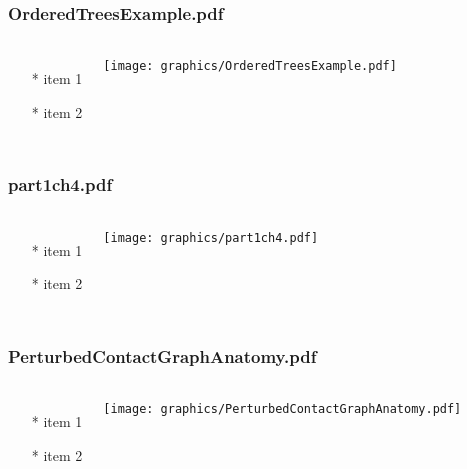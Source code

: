 \begin{frame} \frametitle{OrderedTreesExample.pdf}
    \begin{columns}[c]
        \begin{itemize}
            \item[*] item 1
            \item[*] item 2
        \end{itemize}
        \begin{minipage}{\linewidth}
            \begin{center}
            \texttt{[image: graphics/OrderedTreesExample.pdf]}
            \label{gfx:OrderedTreesExample.pdf}
            \end{center}
        \end{minipage}
    \end{columns}
\end{frame}
\begin{frame} \frametitle{part1ch4.pdf}
    \begin{columns}[c]
        \begin{itemize}
            \item[*] item 1
            \item[*] item 2
        \end{itemize}
        \begin{minipage}{\linewidth}
            \begin{center}
            \texttt{[image: graphics/part1ch4.pdf]}
            \label{gfx:part1ch4.pdf}
            \end{center}
        \end{minipage}
    \end{columns}
\end{frame}
\begin{frame} \frametitle{PerturbedContactGraphAnatomy.pdf}
    \begin{columns}[c]
        \begin{itemize}
            \item[*] item 1
            \item[*] item 2
        \end{itemize}
        \begin{minipage}{\linewidth}
            \begin{center}
            \texttt{[image: graphics/PerturbedContactGraphAnatomy.pdf]}
            \label{gfx:PerturbedContactGraphAnatomy.pdf}
            \end{center}
        \end{minipage}
    \end{columns}
\end{frame}
